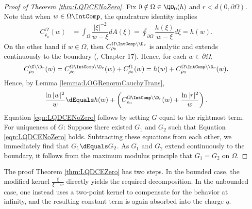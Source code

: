 \documentclass{article}
\numberwithin{equation}{section}
\begin{document}
\begin{proof}[Proof of Theorem \ref{thm:LQDCENoZero}]\label{proof:LQDCENoZero}
Fix $0\notin\Omega\in\QD_0(h)$ and $r<d(0,\partial\Omega)$. Note that when $w\in\Omega\IntComp$, the quadrature identity implies
\begin{align*}
    C_{\rho_0}^{\Omega}(w)&=\int_{\Omega}\dfrac{|\xi|^{-2}}{w-\xi}dA(\xi)=\oint_{\partial\Omega}\dfrac{h(\xi)}{w-\xi}d\xi=h(w).
\end{align*}
On the other hand if $w\in\Omega$, then $C_{\rho_0}^{\Omega\IntComp\setminus\D_r}$ is analytic and extends continuously to the boundary (\cite{BellCauchyTransform}, Chapter 17). Hence, for each $w\in\partial\Omega$,
\begin{align*}
    C_{\rho_0}^{\C\setminus\D_r}(w)=C_{\rho_0}^{\Omega\IntComp\setminus\D_r}(w)+C_{\rho_0}^{\Omega}(w)=h(w)+C_{\rho_0}^{\Omega\IntComp\setminus\D_r}(w).
\end{align*}
Hence, by Lemma \ref{lemma:LOGRenormCauchyTrans},
\begin{align*}
    \dfrac{\ln|w|^2}{w}\dEquals h(w)+\left(C_{\rho_0}^{\Omega\IntComp\setminus\D_r}(w)+\dfrac{\ln|r|^2}{w}\right).
\end{align*}
Equation \ref{eqn:LQDCENoZero} follows by setting $G$ equal to the rightmost term. For uniqueness of $G$: Suppose there existed $G_1$ and $G_2$ such that Equation \ref{eqn:LQDCENoZero} holds. Subtracting these equations from each other, we immediately find that $G_1\dEquals G_2$. As $G_1$ and $G_2$ extend continuously to the boundary, it follows from the maximum modulus principle that $G_1=G_2$ on $\Omega$.
\end{proof}


The proof Theorem \ref{thm:LQDCEZero} has two steps. In the bounded case, the modified kernel $\frac{\xi}{\xi-w}$ directly yields the required decomposition. In the unbounded case, one instead uses a two-point kernel to compensate for the behavior at infinity, and the resulting constant term is again absorbed into the charge $q$.
\end{document}
